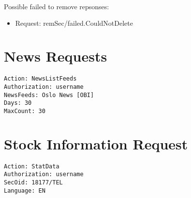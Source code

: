 \documentclass[12pt,twoside,letterpaper]{report}
\begin{document}
Possible failed to remove repsonses:
\begin{itemize}
\item Request: remSec/failed.CouldNotDelete
\end{itemize}

\section*{News Requests}
\begin{verbatim}
Action: NewsListFeeds
Authorization: username
NewsFeeds: Oslo News [OBI]
Days: 30
MaxCount: 30
\end{verbatim}

\section*{Stock Information Request}
\begin{verbatim}
Action: StatData
Authorization: username
SecOid: 18177/TEL
Language: EN
\end{verbatim}
\end{document}
